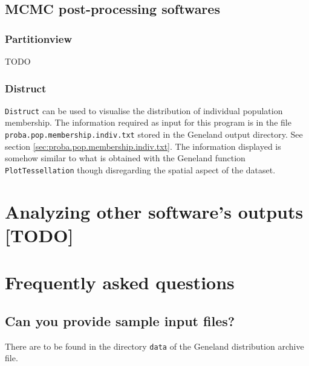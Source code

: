 \documentclass[a4paper,10pt]{article}
\begin{document}
\subsection{MCMC post-processing  softwares}
\subsubsection{Partitionview}

TODO

\subsubsection{Distruct}
\texttt{Distruct} can be used to visualise the distribution of individual population membership. 
The information required as input for this program is in the file \texttt{proba.pop.membership.indiv.txt} stored in the {\sc Geneland} output directory. 
See section \ref{sec:proba.pop.membership.indiv.txt}. 
The information displayed is somehow similar to what is obtained with the {\sc Geneland} function \texttt{PlotTessellation} 
though disregarding the spatial aspect of the dataset. 




\section{Analyzing other software's outputs [TODO]}

\appendix
\clearpage
\section{Frequently asked questions}

\subsection{Can you provide sample input files?}
There are to be found in the directory {\tt data} of the Geneland distribution archive file.
\end{document}
